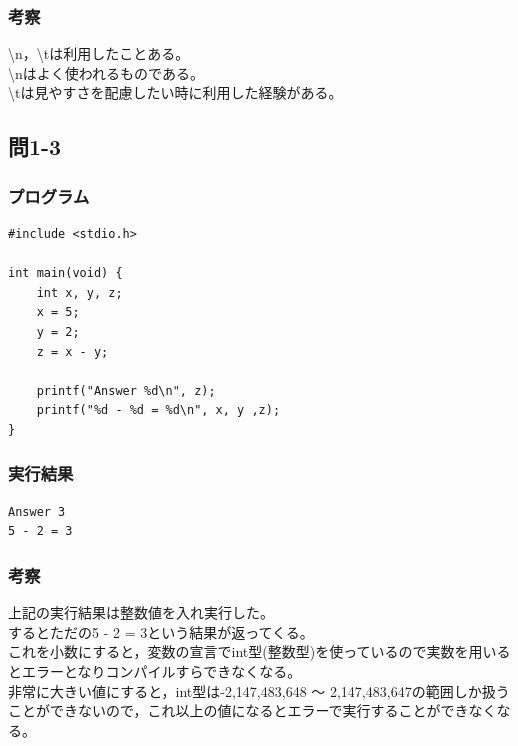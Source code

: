 \documentclass{jarticle}
\begin{document}
\subsubsection{考察\\}
\textbackslash{n}，\textbackslash{t}は利用したことある。\\
\textbackslash{n}はよく使われるものである。\\
\textbackslash{t}は見やすさを配慮したい時に利用した経験がある。\\

\subsection{問1-3\\}
\subsubsection{プログラム\\}
\begin{breakbox}
\begin{verbatim}
#include <stdio.h>

int main(void) {
	int x, y, z;
	x = 5;
	y = 2;
	z = x - y;
	
	printf("Answer %d\n", z);
	printf("%d - %d = %d\n", x, y ,z);
}
\end{verbatim}
\end{breakbox}
\subsubsection{実行結果\\}
\begin{breakbox}
\begin{verbatim}
Answer 3
5 - 2 = 3
\end{verbatim}
\end{breakbox}
\subsubsection{考察\\}
上記の実行結果は整数値を入れ実行した。\\
するとただの5 - 2 = 3という結果が返ってくる。\\
これを小数にすると，変数の宣言でint型(整数型)を使っているので実数を用いるとエラーとなりコンパイルすらできなくなる。\\
非常に大きい値にすると，int型は-2,147,483,648 〜 2,147,483,647の範囲しか扱うことができないので，これ以上の値になるとエラーで実行することができなくなる。\\
\end{document}
